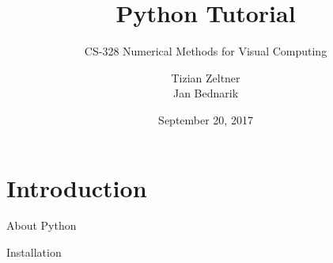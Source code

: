 \documentclass[10pt]{beamer}
\title{Python Tutorial}
\subtitle{CS-328 Numerical Methods for Visual Computing}
\date{September 20, 2017}
\author{Tizian Zeltner\\
Jan Bednarik}
\newcommand\cpp[1]{\cpluspluslogo #1}
\begin{document}
\maketitle


\section{Introduction}


\begin{frame}{About Python}



%
%
%
%
%
%
\end{frame}


\begin{frame}{Installation}
%
\end{frame}
\end{document}
